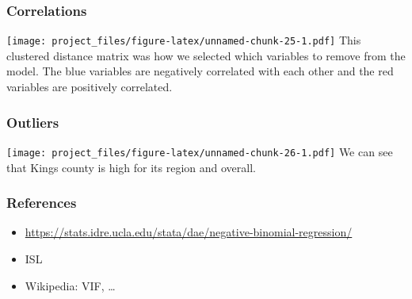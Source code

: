 \documentclass[]{article}
\providecommand{\tightlist}{%
  \setlength{\itemsep}{0pt}\setlength{\parskip}{0pt}}
\begin{document}
\subsubsection{Correlations}\label{correlations}

\texttt{[image: project\_files/figure-latex/unnamed-chunk-25-1.pdf]} This
clustered distance matrix was how we selected which variables to remove
from the model. The blue variables are negatively correlated with each
other and the red variables are positively correlated.

\subsubsection{Outliers}\label{outliers-1}

\texttt{[image: project\_files/figure-latex/unnamed-chunk-26-1.pdf]} We
can see that Kings county is high for its region and overall.

\subsubsection{References}\label{references}

\begin{itemize}
\tightlist
\item
  \url{https://stats.idre.ucla.edu/stata/dae/negative-binomial-regression/}
\item
  ISL
\item
  Wikipedia: VIF, \ldots{}
\end{itemize}
\end{document}
